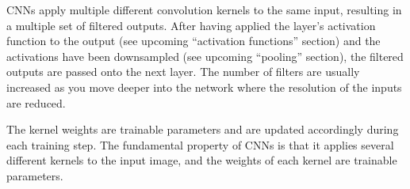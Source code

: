 CNNs apply multiple different convolution kernels to the same input, resulting in a multiple set of filtered outputs.
After having applied the layer's activation function to the output (see upcoming \enquote{activation functions} section) and the activations have been downsampled (see upcoming \enquote{pooling} section), the filtered outputs are passed onto the next layer.
The number of filters are usually increased as you move deeper into the network where the resolution of the inputs are reduced.


The kernel weights are trainable parameters and are updated accordingly during each training step.
The fundamental property of CNNs is that it applies several different kernels to the input image, and the weights of each kernel are trainable parameters.
